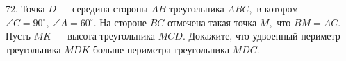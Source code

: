 72. Точка $D$ --- середина стороны $AB$ треугольника $ABC,$ в котором $\angle C=90^{\circ},\ \angle A=60^{\circ}.$ На стороне $BC$ отмечена такая точка $M,$ что $BM=AC.$ Пусть $MK$ --- высота треугольника $MCD.$ Докажите, что удвоенный периметр треугольника $MDK$ больше периметра треугольника $MDC.$\\
